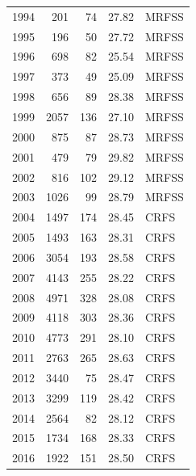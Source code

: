 \documentclass[12pt,]{article}
\begin{document}
\begin{table}[ht]
\begin{tabular}{rrrrl}
  1994 & 201 &  74 & 27.82 & MRFSS \\ 
  1995 & 196 &  50 & 27.72 & MRFSS \\ 
  1996 & 698 &  82 & 25.54 & MRFSS \\ 
  1997 & 373 &  49 & 25.09 & MRFSS \\ 
  1998 & 656 &  89 & 28.38 & MRFSS \\ 
  1999 & 2057 & 136 & 27.10 & MRFSS \\ 
  2000 & 875 &  87 & 28.73 & MRFSS \\ 
  2001 & 479 &  79 & 29.82 & MRFSS \\ 
  2002 & 816 & 102 & 29.12 & MRFSS \\ 
  2003 & 1026 &  99 & 28.79 & MRFSS \\ 
  2004 & 1497 & 174 & 28.45 & CRFS \\ 
  2005 & 1493 & 163 & 28.31 & CRFS \\ 
  2006 & 3054 & 193 & 28.58 & CRFS \\ 
  2007 & 4143 & 255 & 28.22 & CRFS \\ 
  2008 & 4971 & 328 & 28.08 & CRFS \\ 
  2009 & 4118 & 303 & 28.36 & CRFS \\ 
  2010 & 4773 & 291 & 28.10 & CRFS \\ 
  2011 & 2763 & 265 & 28.63 & CRFS \\ 
  2012 & 3440 &  75 & 28.47 & CRFS \\ 
  2013 & 3299 & 119 & 28.42 & CRFS \\ 
  2014 & 2564 &  82 & 28.12 & CRFS \\ 
  2015 & 1734 & 168 & 28.33 & CRFS \\ 
  2016 & 1922 & 151 & 28.50 & CRFS \\ 
   \hline
\end{tabular}
\end{table}

\FloatBarrier
\end{document}
